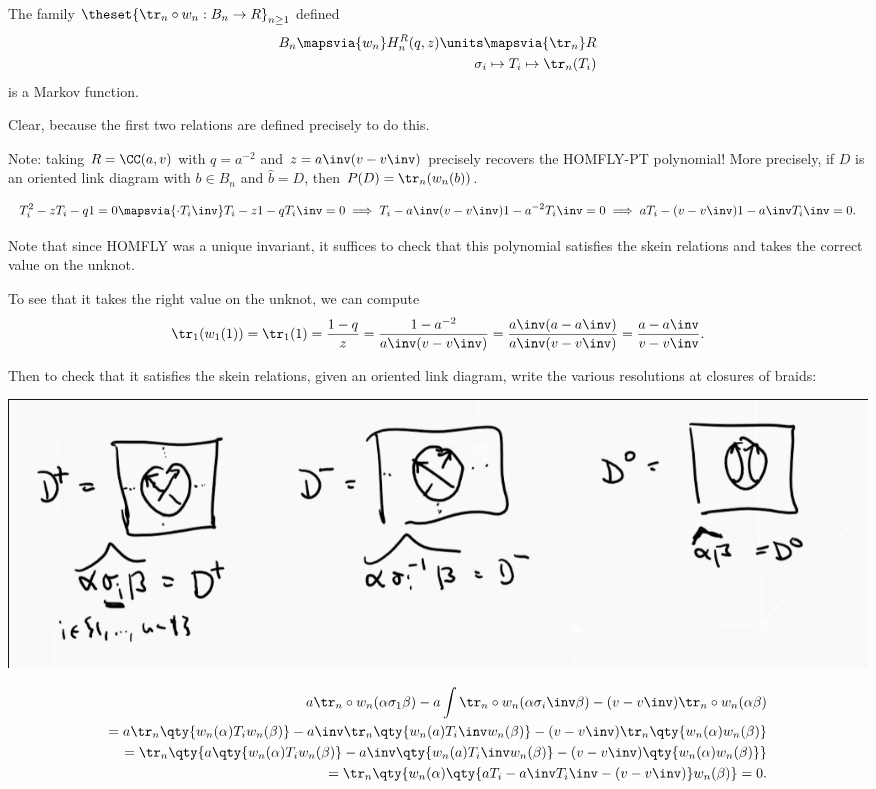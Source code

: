 \begin{description}
\tightlist
\item[Theorem]
The family \(\theset{\tr_n \circ w_n: B_n \to R}_{n\geq 1}\) defined
\begin{align*}
B_n \mapsvia{w_n} H_n^R(q, z)\units \mapsvia{\tr_n} R \\
\sigma_i \mapsto T_i \mapsto \tr_n(T_i)
\end{align*} is a Markov function.
\item[Proof]
Clear, because the first two relations are defined precisely to do this.
\end{description}

Note: taking \(R = \CC(a, v)\) with \(q = a^{-2}\) and
\(z = a\inv(v - v\inv)\) precisely recovers the HOMFLY-PT polynomial!
More precisely, if \(D\) is an oriented link diagram with \(b\in B_n\)
and \(\hat b = D\), then \(P(D) = \tr_n(w_n(b))\).

\begin{align*}
T_i^2 - zT_i -q1 = 0 \mapsvia{\cdot T_i\inv} T_i -z1 - qT_i\inv = 0 \implies T_i - a\inv(v-v\inv)1 - a^{-2} T_i\inv = 0 \implies aT_i - (v-v\inv)1 - a\inv T_i\inv = 0
.\end{align*}

Note that since HOMFLY was a unique invariant, it suffices to check that
this polynomial satisfies the skein relations and takes the correct
value on the unknot.

To see that it takes the right value on the unknot, we can compute
\begin{align*}
\tr_1(w_1(1)) = \tr_1(1) = {1-q \over z} = {1 - a^{-2} \over a\inv(v - v\inv)} = {a\inv(a - a\inv) \over a\inv(v - v\inv)} = {a-a\inv \over v-v\inv}
.\end{align*}

Then to check that it satisfies the skein relations, given an oriented
link diagram, write the various resolutions at closures of braids:

\includegraphics{figures/image_2020-07-10-11-40-29.png}

\begin{align*}
a \tr_n \circ w_n(\alpha \sigma_1 \beta)- a\int \tr_n \circ w_n (\alpha \sigma_i\inv \beta) - (v-v\inv) \tr_n \circ w_n(\alpha \beta) \\
= a \tr_n \qty{ w_n(\alpha) T_i w_n(\beta)} - a\inv \tr_n \qty{ w_n(a) T_i\inv w_n(\beta)} - (v-v\inv) \tr_n\qty{ w_n(\alpha) w_n(\beta)} \\
= \tr_n \qty{ a \qty{ w_n(\alpha) T_i w_n(\beta)} - a\inv \qty{ w_n(a) T_i\inv w_n(\beta)} - (v-v\inv) \qty{ w_n(\alpha) w_n(\beta)}} \\
= \tr_n\qty{ w_n(\alpha) \qty{ aT_i - a\inv T_i\inv - (v-v\inv)  }w_n(\beta) } 
= 0
.\end{align*}

